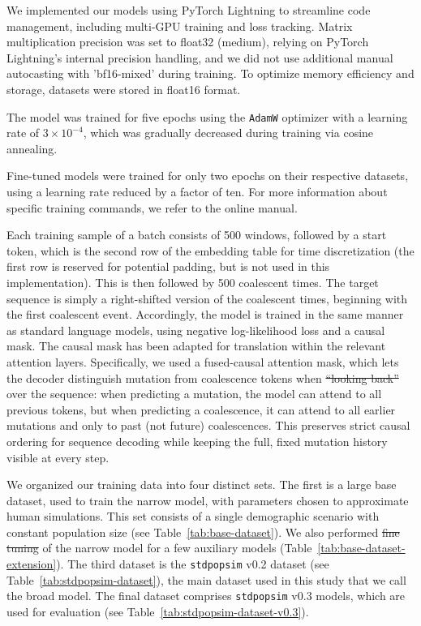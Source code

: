\documentclass[9pt,twoside]{pnas-new} %
\makeatletter
\newcommand{\stdpopsim}{\texttt{stdpopsim}\xspace}
\providecommand{\DIFadd}[1]{{\protect\color{blue}\uwave{#1}}} %
\providecommand{\DIFdel}[1]{{\protect\color{red}\sout{#1}}} %
\providecommand{\DIFaddbegin}{} %
\providecommand{\DIFaddend}{} %
\providecommand{\DIFdelbegin}{} %
\providecommand{\DIFdelend}{} %
\let\sout@orig\sout %
\renewcommand{\sout}[1]{\ifmmode\text{\sout@orig{\ensuremath{#1}}}\else\sout@orig{#1}\fi} %
\makeatother
\begin{document}
We implemented our models using PyTorch Lightning to streamline code management,
including multi-GPU training and loss tracking. 
Matrix multiplication precision was set to float32 (medium), 
relying on PyTorch Lightning's internal precision handling, 
and we did not use additional manual autocasting with 'bf16-mixed' during training. 
To optimize memory efficiency and storage, datasets were stored in float16 format.

The model was trained for five epochs using the \texttt{AdamW} optimizer with a learning rate of $3\times10^{-4}$,
which was gradually decreased during training via cosine annealing.

Fine-tuned models were trained for only two epochs on their respective datasets, using a learning rate reduced by a factor of ten. For more information about specific training commands, we refer to the online manual.

Each training sample of a batch consists of 500 windows, followed by a start token, 
which is the second row of the embedding table for time discretization 
(the first row is reserved for potential padding, but is not used in this implementation).
This is then followed by 500 coalescent times. The target sequence is simply a right-shifted version of the coalescent times, beginning with the first coalescent event.
Accordingly, the model is trained in the same manner as standard language models, using negative log-likelihood loss and a causal mask. The causal mask has been adapted for translation within the relevant attention layers. Specifically, we used a fused-causal attention mask, which lets the decoder distinguish mutation from coalescence tokens when \DIFdelbegin \DIFdel{“looking back” }\DIFdelend \DIFaddbegin \DIFadd{"looking back" }\DIFaddend over the sequence: when predicting a mutation, the model can attend to all previous tokens, but when predicting a coalescence, it can attend to all earlier mutations and only to past (not future) coalescences. This preserves strict causal ordering for sequence decoding while keeping the full, fixed mutation history visible at every step.


We organized our training data into four distinct sets. The first is a large base dataset,
used to train the narrow model, with parameters chosen to approximate human simulations.
This set consists of a single demographic scenario with constant population size
(see Table~\ref{tab:base-dataset}). 
We also performed \DIFdelbegin \DIFdel{fine tuning }\DIFdelend \DIFaddbegin \DIFadd{fine-tuning }\DIFaddend of the narrow model for a
few auxiliary models (Table~\ref{tab:base-dataset-extension}).
The third dataset is the \stdpopsim v0.2 dataset (see Table~\ref{tab:stdpopsim-dataset}), 
the main dataset used in this study that we call the broad model. 
The final dataset comprises \stdpopsim v0.3 models, which are used for evaluation (see Table~\ref{tab:stdpopsim-dataset-v0.3}).
\end{document}
